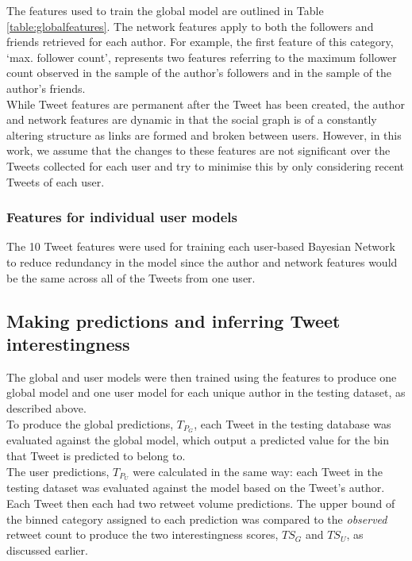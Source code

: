 The features used to train the global model are outlined in Table \ref{table:globalfeatures}. The network features apply to both the followers and friends retrieved for each author. For example, the first feature of this category, `max. follower count', represents two features referring to the maximum follower count observed in the sample of the author's followers and in the sample of the author's friends. \\
While Tweet features are permanent after the Tweet has been created, the author and network features are dynamic in that the social graph is of a constantly altering structure as links are formed and broken between users. However, in this work, we assume that the changes to these features are not significant over the Tweets collected for each user and try to minimise this by only considering recent Tweets of each user.

\subsubsection{Features for individual user models} 
The 10 Tweet features were used for training each user-based Bayesian Network to reduce redundancy in the model since the author and network features would be the same across all of the Tweets from one user.



\subsection{Making predictions and inferring Tweet interestingness}
The global and user models were then trained using the features to produce one global model and one user model for each unique author in the testing dataset, as described above.\\
To produce the global predictions, $ T_{P_G} $, each Tweet in the testing database was evaluated against the global model, which output a predicted value for the bin that Tweet is predicted to belong to.\\
The user predictions, $ T_{P_U} $ were calculated in the same way: each Tweet in the testing dataset was evaluated against the model based on the Tweet's author.\\
Each Tweet then each had two retweet volume predictions. The upper bound of the binned category assigned to each prediction was compared to the \textit{observed} retweet count to produce the two interestingness scores, $ TS_G $ and $ TS_U $, as discussed earlier.


